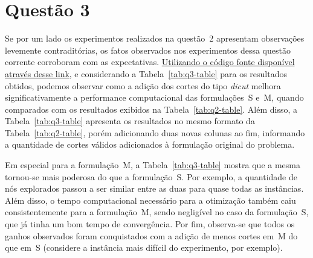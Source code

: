 \documentclass{article}
\begin{document}
\section{Questão 3}
\label{sec:questao-3}

Se por um lado os experimentos realizados na questão~2 apresentam observações levemente contraditórias, os fatos observados nos experimentos dessa questão corrente corroboram com as expectativas.
\href{https://github.com/jose-joaquim/ogp-ufmg20251/blob/main/2nd-exam/question3.py}{Utilizando o código fonte disponível através desse link}, e considerando a Tabela~\ref{tab:q3-table} para os resultados obtidos, podemos observar como a adição dos cortes do tipo \textit{dicut} melhora significativamente a performance computacional das formulações~S e~M, quando comparados com os resultados exibidos na Tabela~\ref{tab:q2-table}.
Além disso, a Tabela~\ref{tab:q3-table} apresenta os resultados no mesmo formato da Tabela~\ref{tab:q2-table}, porém adicionando duas novas colunas ao fim, informando a quantidade de cortes válidos adicionados à formulação original do problema.

Em especial para a formulação~M, a Tabela~\ref{tab:q3-table} mostra que a mesma tornou-se mais poderosa do que a formulação~S.
Por exemplo, a quantidade de nós explorados passou a ser similar entre as duas para quase todas as instâncias.
Além disso, o tempo computacional necessário para a otimização também caiu consistentemente para a formulação~M, sendo negligível no caso da formulação~S, que já tinha um bom tempo de convergência.
Por fim, observa-se que todos os ganhos observados foram conquistados com a adição de menos cortes em~M do que em~S (considere a instância mais difícil do experimento, por exemplo).
\end{document}
